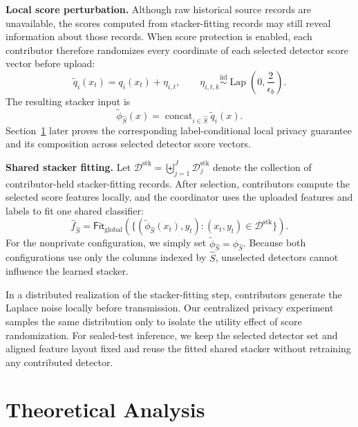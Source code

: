 \documentclass[conference]{IEEEtran}
\theoremstyle{definition}
\newcommand{\bheading}[1]{\noindent\textbf{#1.}\xspace}
\begin{document}
\bheading{Local score perturbation}
Although raw historical source records are unavailable, the scores computed from stacker-fitting records may still reveal information about those records.
When score protection is enabled, each contributor therefore randomizes every coordinate of each selected detector score vector before upload:
\begin{equation}
\widetilde q_i(x_t)=q_i(x_t)+\eta_{i,t},
\qquad
\eta_{i,t,k}\overset{\mathrm{iid}}{\sim}
\operatorname{Lap}\!\left(0,\frac{2}{\epsilon_b}\right).
\label{eq:local_laplace_release}
\end{equation}
The resulting stacker input is
\begin{equation}
\widetilde\phi_{\widehat S}(x)=
\operatorname{concat}_{i\in\widehat S}\widetilde q_i(x).
\label{eq:private_selected_representation}
\end{equation}
Section~\ref{sec:method_analysis} later proves the corresponding label-conditional local privacy guarantee and its composition across selected detector score vectors.

\bheading{Shared stacker fitting}
Let $\mathcal D^{\mathrm{stk}}=\biguplus_{j=1}^{J}\mathcal D_j^{\mathrm{stk}}$ denote the collection of contributor-held stacker-fitting records.
After selection, contributors compute the selected score features locally, and the coordinator uses the uploaded features and labels to fit one shared classifier:
\begin{equation}
\widehat f_{\widehat S}=\mathsf{Fit}_{\mathrm{global}}
\left(
\{(\widetilde\phi_{\widehat S}(x_t),y_t):
(x_t,y_t)\in\mathcal D^{\mathrm{stk}}\}
\right).
\label{eq:shared_stacker}
\end{equation}
For the nonprivate configuration, we simply set $\widetilde\phi_{\widehat S}=\phi_{\widehat S}$.
Because both configurations use only the columns indexed by $\widehat S$, unselected detectors cannot influence the learned stacker.

In a distributed realization of the stacker-fitting step, contributors generate the Laplace noise locally before transmission.
Our centralized privacy experiment samples the same distribution only to isolate the utility effect of score randomization.
For sealed-test inference, we keep the selected detector set and aligned feature layout fixed and reuse the fitted shared stacker without retraining any contributed detector.

\section{Theoretical Analysis}
\label{sec:method_analysis}
\end{document}
